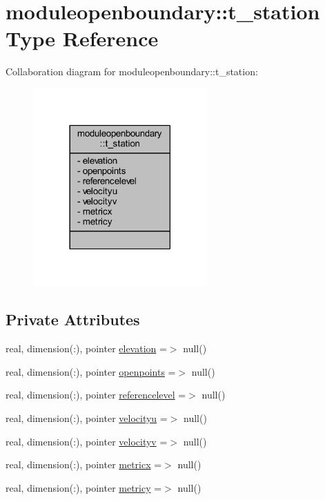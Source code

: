 \hypertarget{structmoduleopenboundary_1_1t__station}{}\section{moduleopenboundary\+:\+:t\+\_\+station Type Reference}
\label{structmoduleopenboundary_1_1t__station}


Collaboration diagram for moduleopenboundary\+:\+:t\+\_\+station\+:\nopagebreak
\begin{figure}[H]
\begin{center}
\leavevmode
\includegraphics[width=189pt]{structmoduleopenboundary_1_1t__station__coll__graph}
\end{center}
\end{figure}
\subsection*{Private Attributes}
\begin{DoxyCompactItemize}
\item 
real, dimension(\+:), pointer \mbox{\hyperlink{structmoduleopenboundary_1_1t__station_ae041e3b9b9993effca0099603ef95f5b}{elevation}} =$>$ null()
\item 
real, dimension(\+:), pointer \mbox{\hyperlink{structmoduleopenboundary_1_1t__station_a419a4918d6b86864fca5ab019c20a18c}{openpoints}} =$>$ null()
\item 
real, dimension(\+:), pointer \mbox{\hyperlink{structmoduleopenboundary_1_1t__station_a6b4c90da0e1f589b54deffb531a78307}{referencelevel}} =$>$ null()
\item 
real, dimension(\+:), pointer \mbox{\hyperlink{structmoduleopenboundary_1_1t__station_ab25ce165506e2e210debe147467d2920}{velocityu}} =$>$ null()
\item 
real, dimension(\+:), pointer \mbox{\hyperlink{structmoduleopenboundary_1_1t__station_aece684393400773040e5d5af525e6895}{velocityv}} =$>$ null()
\item 
real, dimension(\+:), pointer \mbox{\hyperlink{structmoduleopenboundary_1_1t__station_a52752111ec819cbfa75fb3dbeb38d72a}{metricx}} =$>$ null()
\item 
real, dimension(\+:), pointer \mbox{\hyperlink{structmoduleopenboundary_1_1t__station_a08cca7052e567026b89603d9597be8ff}{metricy}} =$>$ null()
\end{DoxyCompactItemize}


